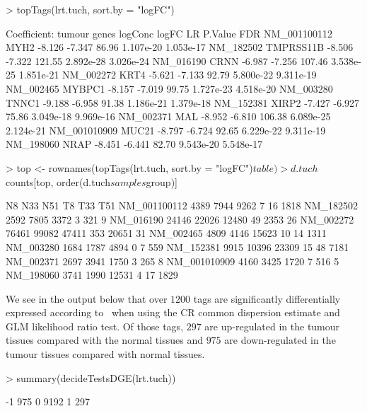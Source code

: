 \begin{Schunk}
\begin{Sinput}
> topTags(lrt.tuch, sort.by = "logFC")
\end{Sinput}
\begin{Soutput}
Coefficient:  tumour 
                 genes logConc  logFC     LR   P.Value       FDR
NM_001100112      MYH2  -8.126 -7.347  86.96 1.107e-20 1.053e-17
NM_182502    TMPRSS11B  -8.506 -7.322 121.55 2.892e-28 3.026e-24
NM_016190         CRNN  -6.987 -7.256 107.46 3.538e-25 1.851e-21
NM_002272         KRT4  -5.621 -7.133  92.79 5.800e-22 9.311e-19
NM_002465       MYBPC1  -8.157 -7.019  99.75 1.727e-23 4.518e-20
NM_003280        TNNC1  -9.188 -6.958  91.38 1.186e-21 1.379e-18
NM_152381        XIRP2  -7.427 -6.927  75.86 3.049e-18 9.969e-16
NM_002371          MAL  -8.952 -6.810 106.38 6.089e-25 2.124e-21
NM_001010909     MUC21  -8.797 -6.724  92.65 6.229e-22 9.311e-19
NM_198060         NRAP  -8.451 -6.441  82.70 9.543e-20 5.548e-17
\end{Soutput}
\begin{Sinput}
> top <- rownames(topTags(lrt.tuch, sort.by = "logFC")$table)
> d.tuch$counts[top, order(d.tuch$samples$group)]
\end{Sinput}
\begin{Soutput}
                N8   N33   N51  T8   T33  T51
NM_001100112  4389  7944  9262   7    16 1818
NM_182502     2592  7805  3372   3   321    9
NM_016190    24146 22026 12480  49  2353   26
NM_002272    76461 99082 47411 353 20651   31
NM_002465     4809  4146 15623  10    14 1311
NM_003280     1684  1787  4894   0     7  559
NM_152381     9915 10396 23309  15    48 7181
NM_002371     2697  3941  1750   3   265    8
NM_001010909  4160  3425  1720   7   516    5
NM_198060     3741  1990 12531   4    17 1829
\end{Soutput}
\end{Schunk}


We see in the output below that over $1200$ tags are significantly
differentially expressed according to \edgeR~when using the CR common
dispersion estimate and GLM likelihood ratio test. Of those tags,
$297$ are up-regulated in the tumour tissues compared with the normal
tissues and $975$ are down-regulated in the tumour tissues compared
with normal tissues.

\begin{Schunk}
\begin{Sinput}
> summary(decideTestsDGE(lrt.tuch))
\end{Sinput}
\begin{Soutput}
   [,1]
-1  975
0  9192
1   297
\end{Soutput}
\end{Schunk}


